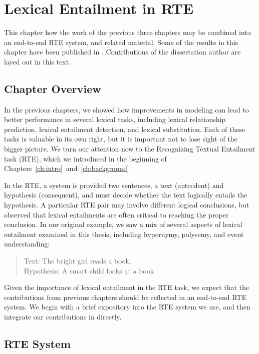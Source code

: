\chapter{Lexical Entailment in RTE}
\label{ch:rte}

This chapter how the work of the previous three chapters may be combined into
an end-to-end RTE system, and related material. Some of the results in this
chapter have been published in . Contributions
of the dissertation author are layed out in this text.

\section{Chapter Overview}

In the previous chapters, we showed how improvements in modeling can lead
to better performance in several lexical tasks, including lexical relationship
prediction, lexical entailment detection, and lexical substitution. Each of
these tasks is valuable in its own right, but it is important not to lose
sight of the bigger picture. We turn our attention now to the Recognizing
Textual Entailment task (RTE), which we introduced in the beginning of
Chapters~\ref{ch:intro}~and~\ref{ch:background}.

In the RTE, a system is provided two sentences, a text (antecdent) and
hypothesis (consequent), and must decide whether the text logically
entails the hypothesis.
A particular RTE pair may involve different logical conclusions, but
 observed that lexical entailments are often critical
to reaching the proper conclusion. In our original example, we saw a mix of
several aspects of lexical entailment examined in this thesis, including
hypernymy, polysemy, and event understanding:
\begin{quote}
  \label{ex:rte}
  Text: The bright girl reads a book.\\
  Hypothesis: A smart child looks at a book.
\end{quote}
Given the importance of lexical entailment in the RTE task, we expect that
the contributions from previous chapters should be reflected in an end-to-end
RTE system. We begin with a brief expository into the RTE system we use, and
then integrate our contributions in directly.

\section{RTE System}
\label{sec:rtesystem}

